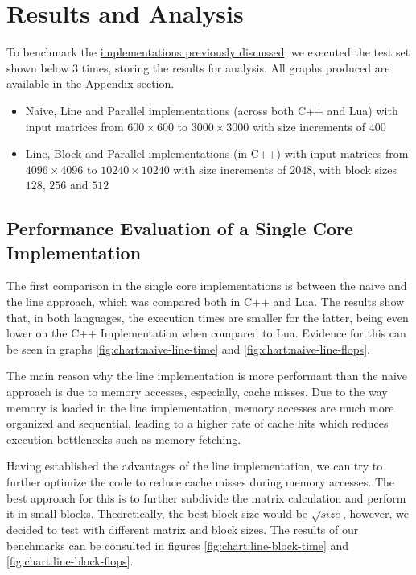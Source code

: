 \section{Results and Analysis} \label{section:results}

To benchmark the \hyperref[section:algorithms]{implementations previously discussed}, we executed the test set shown below 3 %
times, storing the results for analysis. All graphs produced are available in the \hyperref[section:appendix]{Appendix section}.

\begin{itemize}
    \item Naive, Line and Parallel implementations (across both C++ and Lua) with input matrices from $600 \times 600$ to $3000 \times 3000$ with size increments of $400$
    \item Line, Block and Parallel implementations (in C++) with input matrices from $4096 \times 4096$ to $10240 \times 10240$ with size increments of $2048$, with block sizes $128$, $256$ and $512$
\end{itemize}

\subsection{Performance Evaluation of a Single Core Implementation}

The first comparison in the single core implementations is between the naive and the line approach, which was compared both in C++ and Lua. The results show that, in both languages, the execution times are smaller for the latter, being even lower on the C++ Implementation when compared to Lua. Evidence for this can be seen in graphs \ref{fig:chart:naive-line-time} and \ref{fig:chart:naive-line-flops}.

The main reason why the line implementation is more performant than the naive approach is due to memory accesses, especially, cache misses. Due to the way memory is loaded in the line implementation, memory accesses are much more organized and sequential, leading to a higher rate of cache hits which reduces execution bottlenecks such as memory fetching. 

Having established the advantages of the line implementation, we can try to further optimize the code to reduce cache misses during memory accesses. The best approach for this is to further subdivide the matrix calculation and perform it in small blocks. Theoretically, the best block size would be $\sqrt {size}$, however, we decided to test with different matrix and block sizes.
The results of our benchmarks can be consulted in figures \ref{fig:chart:line-block-time} and \ref{fig:chart:line-block-flops}.

